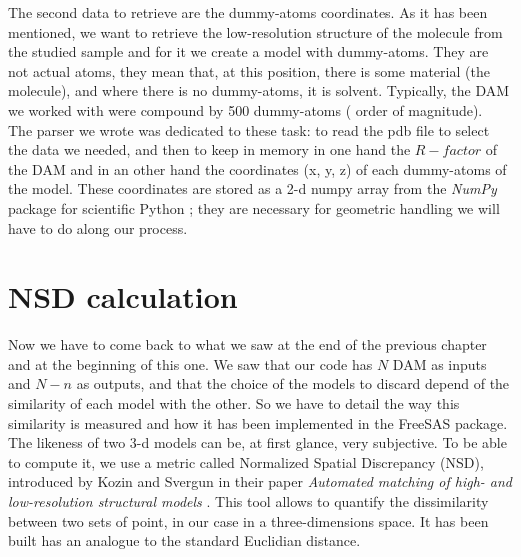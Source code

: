 \documentclass[a4paper, 11pt]{report}
\begin{document}
The second data to retrieve are the dummy-atoms coordinates. 
As it has been mentioned, we want to retrieve the low-resolution 
structure of the molecule from the studied sample and for it we create 
a model with dummy-atoms. 
They are not actual atoms, they mean that, at this position, there is 
some material (the molecule), and where there is no dummy-atoms, it is 
solvent. 
Typically, the DAM we worked with were compound by 500 dummy-atoms (
order of magnitude).\\
The parser we wrote was dedicated to these task: to read the pdb file 
to select the data we needed, and then to keep in memory in one hand 
the $R-factor$ of the DAM and in an other hand the coordinates (x, y, 
z) of each dummy-atoms of the model. 
These coordinates are stored as a 2-d numpy array from the 
\textit{NumPy} package for scientific Python \cite{numpy}; they are 
necessary for geometric handling we will have to do along our process.

\section{NSD calculation}

Now we have to come back to what we saw at the end of the previous 
chapter and at the beginning of this one. 
We saw that our code has $N$ DAM as inputs and $N - n$ as outputs, and 
that the choice of the models to discard depend of the similarity of 
each model with the other. 
So we have to detail the way this similarity is measured and how it 
has been implemented in the FreeSAS package.\\

The likeness of two 3-d models can be, at first glance, very 
subjective. 
To be able to compute it, we use a metric called Normalized Spatial 
Discrepancy (NSD), introduced by Kozin and Svergun in their paper 
\textit{Automated matching of high- and low-resolution structural 
models} \cite{supcomb}. 
This tool allows to quantify the dissimilarity between two sets of 
point, in our case in a three-dimensions space. 
It has been built has an analogue to the standard Euclidian distance.\\
\end{document}
